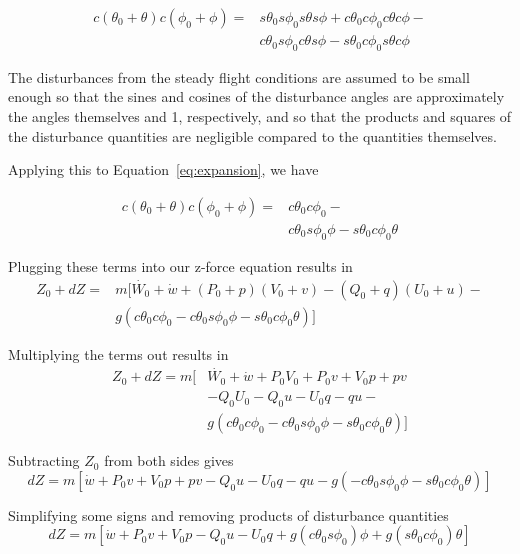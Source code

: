 \documentclass[a4paper]{article}
\begin{document}
\begin{equation} \label{eq:expansion}
\begin{split}
c(\theta_0 + \theta)c(\phi_0 + \phi) = & s\theta_0  s\phi_0 s\theta s\phi + c\theta_0 c\phi_0  c\theta c\phi - \\
                                       & c\theta_0  s\phi_0  c\theta s\phi - s\theta_0 c\phi_0 s\theta c\phi
\end{split}
\end{equation}

\noindent The disturbances from the steady flight conditions are assumed to be small enough so that the sines and cosines of the disturbance angles are approximately the angles themselves and 1, respectively, and so that the products and squares of the disturbance quantities are negligible compared to the quantities themselves.


\noindent Applying this to Equation~\ref{eq:expansion}, we have

\begin{equation}
\begin{split}
c(\theta_0 + \theta)c(\phi_0 + \phi) = & c\theta_0 c\phi_0  - \\
                                       & c\theta_0  s\phi_0 \phi - s\theta_0 c\phi_0 \theta
\end{split}
\end{equation}

\noindent Plugging these terms into our z-force equation results in
\begin{equation*}
\begin{split}
Z_0 + dZ = & m [\dot{W_0} + \dot{w} + (P_0 + p) (V_0 + v) - (Q_0 + q) (U_0 + u) - \\ 
    & g (c\theta_0 c\phi_0  - c\theta_0  s\phi_0 \phi - s\theta_0 c\phi_0 \theta)]
\end{split}
\end{equation*}

\noindent Multiplying the terms out results in
\begin{equation*}
\begin{split}
Z_0 + dZ = m[ & \dot{W_0} + \dot{w} + P_0 V_0 + P_0 v + V_0 p + p v \\
       & - Q_0 U_0 - Q_0 u - U_0 q - q u - \\
       & g (c\theta_0 c\phi_0  - c\theta_0  s\phi_0 \phi - s\theta_0 c\phi_0 \theta)]
\end{split}
\end{equation*}

\noindent Subtracting $Z_0$ from both sides gives
\begin{equation*}
dZ = m[\dot{w} + P_0 v + V_0 p + p v - Q_0 u - U_0 q - q u - g (- c\theta_0  s\phi_0 \phi - s\theta_0 c\phi_0 \theta)]
\end{equation*}

\noindent Simplifying some signs and removing products of disturbance quantities
\begin{equation*}
dZ = m[\dot{w} + P_0 v + V_0 p - Q_0 u - U_0 q + g (c\theta_0  s\phi_0) \phi + g (s\theta_0 c\phi_0) \theta]
\end{equation*}
\end{document}
